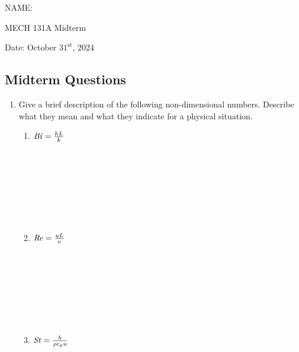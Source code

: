 \documentclass[12pt,letterpaper]{article}
\begin{document}
\noindent
NAME:

\noindent
MECH 131A Midterm

\noindent
Date: October $31^{\mathrm{st}}$, 2024

\subsection*{Midterm Questions}

\begin{enumerate}

    \item Give a brief description of the following non-dimensional numbers.
        Describe what they mean and what they indicate for a physical situation.

    \begin{enumerate}
        \item $\mathit{Bi} = \frac{h L}{k}$ \\ \\ \\ \\ \\ \\ \\ \\
        \item $\mathit{Re} = \frac{u L}{\nu}$ \\ \\ \\ \\ \\ \\ \\ \\
        \item $\mathit{St} = \frac{h}{\rho c_p u}$ \\ \\ \\ \\ \\ \\ \\
    \end{enumerate}
    \newpage


\end{enumerate}
\end{document}
